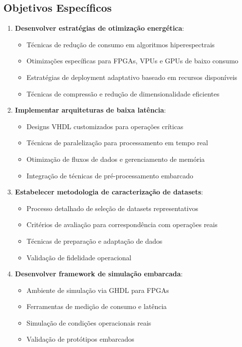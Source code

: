 \subsection{Objetivos Específicos}
\begin{enumerate}
    \item \textbf{Desenvolver estratégias de otimização energética}:
    \begin{itemize}
        \item Técnicas de redução de consumo em algoritmos hiperespectrais
        \item Otimizações específicas para FPGAs, VPUs e GPUs de baixo consumo
        \item Estratégias de deployment adaptativo baseado em recursos disponíveis
        \item Técnicas de compressão e redução de dimensionalidade eficientes
    \end{itemize}
    
    \item \textbf{Implementar arquiteturas de baixa latência}:
    \begin{itemize}
        \item Designs VHDL customizados para operações críticas
        \item Técnicas de paralelização para processamento em tempo real
        \item Otimização de fluxos de dados e gerenciamento de memória
        \item Integração de técnicas de pré-processamento embarcado
    \end{itemize}
    
    \item \textbf{Estabelecer metodologia de caracterização de datasets}:
    \begin{itemize}
        \item Processo detalhado de seleção de datasets representativos
        \item Critérios de avaliação para correspondência com operações reais
        \item Técnicas de preparação e adaptação de dados
        \item Validação de fidelidade operacional
    \end{itemize}
    
    \item \textbf{Desenvolver framework de simulação embarcada}:
    \begin{itemize}
        \item Ambiente de simulação via GHDL para FPGAs
        \item Ferramentas de medição de consumo e latência
        \item Simulação de condições operacionais reais
        \item Validação de protótipos embarcados
    \end{itemize}
    

\end{enumerate}
